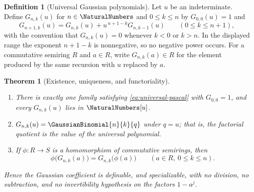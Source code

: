 \documentclass[11pt,a4paper,oneside,openany]{book}
\newtheorem{theorem}{Theorem}[chapter]
\theoremstyle{definition}
\newtheorem{definition}[definition]{Definition}
\theoremstyle{remark}
\begin{document}
\begin{definition}[Universal Gaussian polynomials]\label{def:universal-gaussian}
Let $u$ be an indeterminate.  Define $G_{n,k}(u)$ for $n\in\NaturalNumbers$ and $0\le k\le n$ by
$G_{0,0}(u)=1$ and
\begin{equation}\label{eq:universal-pascal}
 G_{n+1,k}(u)=G_{n,k}(u)+u^{\,n+1-k}G_{n,k-1}(u)
 \qquad(0\le k\le n+1),
\end{equation}
with the convention that $G_{n,k}(u)=0$ whenever $k<0$ or $k>n$.  In the displayed range the exponent $n+1-k$ is nonnegative, so no negative power occurs.  For a commutative semiring $R$ and $a\in R$, write $G_{n,k}(a)\in R$ for the element produced by the same recursion with $u$ replaced by $a$.
\end{definition}

\begin{theorem}[Existence, uniqueness, and functoriality]\label{thm:universal-functoriality}
\sloppy
\begin{enumerate}[label=\textup{(\roman*)}]
\item There is exactly one family satisfying \eqref{eq:universal-pascal}
 with $G_{0,0}=1$, and every $G_{n,k}(u)$ lies in $\NaturalNumbers[u]$.
\item $G_{n,k}(u)=\GaussianBinomial{n}{k}{q}$ under $q=u$; that is, the factorial
 quotient is the value of the universal polynomial.
\item If $\phi\colon R\to S$ is a homomorphism of commutative semirings, then
\[
 \phi\bigl(G_{n,k}(a)\bigr)=G_{n,k}\bigl(\phi(a)\bigr)
 \qquad(a\in R,\ 0\le k\le n).
\]
\end{enumerate}
Hence the Gaussian coefficient is definable, and specializable, with no division, no subtraction, and no invertibility hypothesis on the factors $1-a^j$.
\end{theorem}
\end{document}
